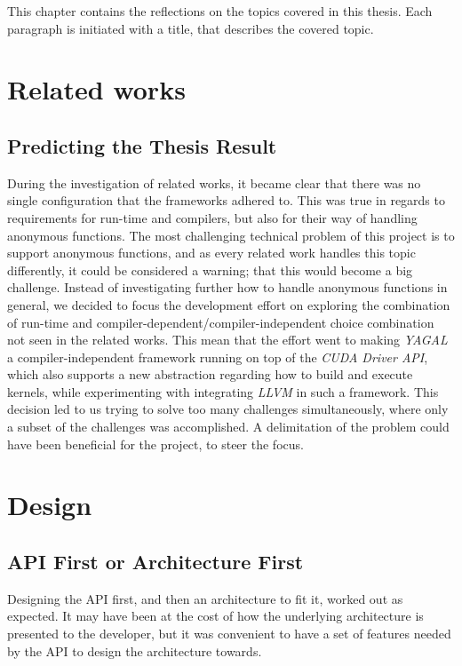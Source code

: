\label{cha:reflection}
This chapter contains the reflections on the topics covered in this thesis. Each paragraph is initiated with a title, that describes the covered topic. 

\section*{Related works}
\subsection*{Predicting the Thesis Result}
During the investigation of related works, it became clear that there was no single configuration that the frameworks adhered to. This was true in regards to requirements for run-time and compilers, but also for their way of handling anonymous functions. The most challenging technical problem of this project is to support anonymous functions, and as every related work handles this topic differently, it could be considered a warning; that this would become a big challenge. Instead of investigating further how to handle anonymous functions in general, we decided to focus the development effort on exploring the combination of run-time and compiler-dependent/compiler-independent choice combination not seen in the related works. This mean that the effort went to making \textit{YAGAL} a compiler-independent framework running on top of the \textit{CUDA Driver API}, which also supports a new abstraction regarding how to build and execute kernels, while experimenting with integrating \textit{LLVM} in such a framework. This decision led to us trying to solve too many challenges simultaneously, where only a subset of the challenges was accomplished. A delimitation of the problem could have been beneficial for the project, to steer the focus.

\section*{Design}
\subsection*{API First or Architecture First}
Designing the API first, and then an architecture to fit it, worked out as expected. It may have been at the cost of how the underlying architecture is presented to the developer, but it was convenient to have a set of features needed by the API to design the architecture towards.

